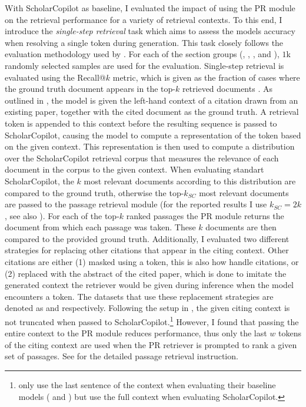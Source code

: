 With ScholarCopilot as baseline, I evaluated the impact of using the PR module on the retrieval performance for a variety of retrieval contexts. To this end, I introduce the \emph{single-step retrieval} task which aims to assess the models accuracy when resolving a single \mono{[RET]} token during generation. This task closely follows the evaluation methodology used by \cite{wang2025scholarcopilot}. For each of the section groups (, , , and ), $1$k randomly selected samples are used for the evaluation. Single-step retrieval is evaluated using the Recall@$k$ metric, which is given as the fraction of cases where the ground truth document appears in the top-$k$ retrieved documents \cite{wang2025scholarcopilot}. As outlined in , the model is given the left-hand context of a citation drawn from an existing paper, together with the cited document as the ground truth. A retrieval token is appended to this context before the resulting sequence is passed to ScholarCopilot, causing the model to compute a representation of the \mono{[RET]} token based on the given context. This representation is then used to compute a distribution over the ScholarCopilot retrieval corpus that measures the relevance of each document in the corpus to the given context. When evaluating standart ScholarCopilot, the $k$ most relevant documents according to this distribution are compared to the ground truth, otherwise the top-$k_{SC}$ most relevant documents are passed to the passage retrieval module (for the reported results I use $k_{SC}=2k$, see also ). For each of the top-$k$ ranked passages the PR module returns the document from which each passage was taken. These $k$ documents are then compared to the provided ground truth. Additionally, I evaluated two different strategies for replacing other citations that appear in the citing context. Other citations are either (1) masked using a \mono{[MASK]} token, this is also how \cite{wang2025scholarcopilot} handle citations, or (2) replaced with the abstract of the cited paper, which is done to imitate the generated context the retriever would be given during inference when the model encounters a \mono{[RET]} token. The datasets that use these replacement strategies are denoted as  and  respectively. Following the setup in \cite{wang2025scholarcopilot}, the given citing context is not truncated when passed to ScholarCopilot.\footnote{\cite{wang2025scholarcopilot} only use the last sentence of the context when evaluating their baseline models ( and ) but use the full context when evaluating ScholarCopilot.} However, I found that passing the entire context to the PR module reduces performance, thus only the last $w$ tokens of the citing context are used when the PR retriever is prompted to rank a given set of passages. See  for the detailed passage retrieval instruction.

